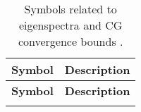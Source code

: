 \begin{longtable}{c p{10cm}}
    \caption{Symbols related to eigenspectra and CG convergence bounds .}\label{tab:eigenspectra_symbols}                                                                    \\
    \hline
    \textbf{Symbol}                  & \textbf{Description}                                                                                                                                      \\
    \hline
    \endfirsthead

    \hline
    \textbf{Symbol}                  & \textbf{Description}                                                                                                                                      \\
    \hline
    \endhead

    \hline
    \endfoot

    \hline
    \endlastfoot


\end{longtable}
